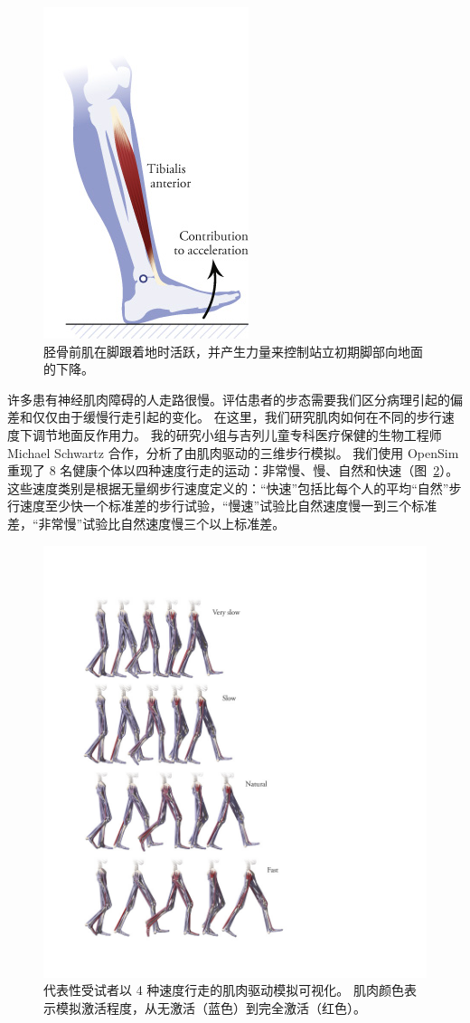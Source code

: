 \begin{figure}[!htb]
	\centering
	\includegraphics[width=0.4\linewidth]{chap11/11_9}
	\caption{胫骨前肌在脚跟着地时活跃，并产生力量来控制站立初期脚部向地面的下降。 \label{fig:11_9}}
\end{figure}


许多患有神经肌肉障碍的人走路很慢。评估患者的步态需要我们区分病理引起的偏差和仅仅由于缓慢行走引起的变化。
在这里，我们研究肌肉如何在不同的步行速度下调节地面反作用力。
我的研究小组与吉列儿童专科医疗保健的生物工程师 Michael Schwartz 合作，分析了由肌肉驱动的三维步行模拟。
我们使用 OpenSim 重现了 8 名健康个体以四种速度行走的运动：非常慢、慢、自然和快速（图~\ref{fig:11_10}）。
这些速度类别是根据无量纲步行速度定义的：“快速”包括比每个人的平均“自然”步行速度至少快一个标准差的步行试验，“慢速”试验比自然速度慢一到三个标准差，“非常慢”试验比自然速度慢三个以上标准差。

\begin{figure}[!htb]
	\centering
	\includegraphics[width=0.6\linewidth]{chap11/11_10}
	\caption{代表性受试者以 4 种速度行走的肌肉驱动模拟可视化。
		肌肉颜色表示模拟激活程度，从无激活（蓝色）到完全激活（红色）\cite{liu2008muscle}。 \label{fig:11_10}}
\end{figure}


